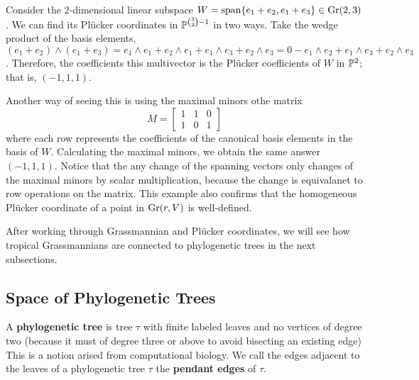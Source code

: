             \begin{example}
            \label{ex:plucker-coordinates-example-2}
                Consider the $2$-dimensional linear subspace 
                $W = \vecspan{e_1 + e_2, e_1 + e_3} \in \gr(2, 3)$.
                We can find its Pl\"{u}cker coordinates in $\P^{\binom{3}{2} - 1}$ in two ways.
                Take the wedge product of the basis elements, 
                $(e_1 + e_2) \wedge (e_1 + e_3) = 
                e_1 \wedge e_1 + e_2 \wedge e_1 + e_1 \wedge e_3 + e_2 \wedge e_3 = 0 - e_1 \wedge e_2 + e_1 \wedge e_3 + e_2 \wedge e_3$.
                Therefore, the coefficients this multivector is the Pl\"{u}cker coefficients of $W$ in $\P^2$;
                that is, $(-1, 1, 1)$. 
                
                Another way of seeing this is using the maximal minors othe matrix 
                \[
                M = 
                \begin{bmatrix}
                    1 & 1 & 0 \\
                    1 & 0 & 1 
                \end{bmatrix}
                \] where each row represents the coefficients of the canonical basis elements in the basis of $W$. 
                Calculating the maximal minors, we obtain the same answer $(-1, 1, 1)$.
                Notice that the any change of the spanning vectors only changes of the maximal minors by scalar multiplication,
                because the change is equivalanet to row operations on the matrix. 
                This example also confirms that the homogeneous Pl\"{u}cker coordinate of a point in $\gr(r, V)$ is well-defined. 
            \end{example}
            
            After working through Grassmannian and Pl\"{u}cker coordinates, 
            we will see how tropical Grassmannians are connected to phylogenetic trees in the next subsections. 
            
    \subsection{Space of Phylogenetic Trees}
    \label{subsec:grassmannians-and-space-of-phylogenetic-trees}
		A \textbf{phylogenetic tree} is tree $\tau$ 
		with finite labeled leaves
		and no vertices of degree two
		(because it must of degree three or above to avoid 
		bisecting an existing edge) 
		This is a notion arised from computational biology.
		We call the edges adjacent to the leaves of a phylogenetic 
		tree $\tau$ the \textbf{pendant edges} of $\tau$. 
		
